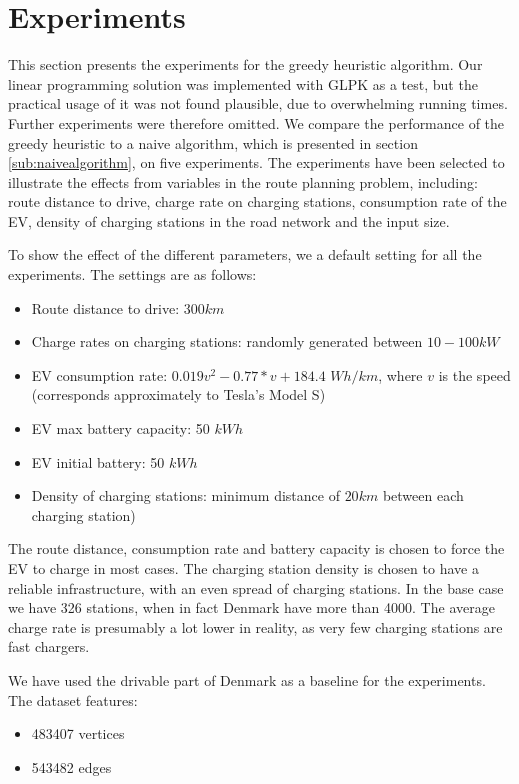 \section{Experiments}
\label{sec:experiments}
This section presents the experiments for the greedy heuristic algorithm. Our linear programming solution was implemented with GLPK as a test, but the practical usage of it was not found plausible, due to overwhelming running times. Further experiments were therefore omitted. We compare the performance of the greedy heuristic to a naive algorithm, which is presented in section \ref{sub:naivealgorithm}, on five experiments. The experiments have been selected to illustrate the effects from variables in the route planning problem, including: route distance to drive, charge rate on charging stations, consumption rate of the EV, density of charging stations in the road network and the input size.

To show the effect of the different parameters, we a default setting for all the experiments. The settings are as follows:
\begin{itemize}
     \item Route distance to drive: $300 \si{km}$
     \item Charge rates on charging stations: randomly generated between $10-100 \si{kW}$
     \item EV consumption rate: $0.019v^2-0.77*v+184.4$ $\si{Wh\per km}$, where $v$ is the speed (corresponds approximately to Tesla's Model S\cite{teslacon})
     \item EV max battery capacity: 50 $\si{kWh}$
	 \item EV initial battery: 50 $\si{kWh}$
     \item Density of charging stations: minimum distance of $20 \si{km}$ between each charging station)
 \end{itemize} 

The route distance, consumption rate and battery capacity is chosen to force the EV to charge in most cases. The charging station density is chosen to have a reliable infrastructure, with an even spread of charging stations. In the base case we have 326 stations, when in fact Denmark have more than 4000\cite{Globalevoutlook}. The average charge rate is presumably a lot lower in reality, as very few charging stations are fast chargers.

We have used the drivable part of Denmark as a baseline for the experiments. The dataset features:
\begin{itemize}
    \item 483407 vertices
    \item 543482 edges
\end{itemize}


















